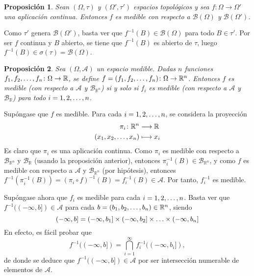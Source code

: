 \documentclass[11pt]{report}
\makeatletter
\renewenvironment{proof}[1][\proofname]{\par
  \pushQED{\qed}%
  \normalfont \topsep\z@skip %
  \trivlist
  \item[\hskip\labelsep
        \itshape
    #1\@addpunct{.}]\ignorespaces
}{%
  \popQED\endtrivlist\@endpefalse
}
\theoremstyle{mytheorem}
\newtheorem{proposition}{Proposición}
\theoremstyle{mydefinition}
\theoremstyle{myexample}
\let\oldproofname=\proofname
\renewcommand{\proofname}{\rm\bf{\oldproofname}}}
\newenvironment{cproposition} %
  {\begin{mdframed}[
        linewidth=3pt,
        linecolor=c2,
        bottomline=false,
        topline=false,
        rightline=false,
        innerrightmargin=0pt,
        innertopmargin=0pt,
        innerbottommargin=0pt,
        innerleftmargin=1em,
        skipabove=\baselineskip]
    \begin{proposition}}
  {\end{proposition}\end{mdframed}}
\newcommand{\R}{\mathbb R}
\makeatother
\begin{document}
\begin{cproposition}
Sean $(\Omega,\tau)$ y $(\Omega',\tau')$ espacios topológicos y sea $f \colon \Omega \to \Omega'$ una aplicación continua. Entonces $f$ es medible con respecto a $\mathcal{B}(\Omega)$ y $\mathcal{B}(\Omega')$.
\end{cproposition}

\begin{proof}
Como $\tau'$ genera $\mathcal{B}(\Omega')$, basta ver que $f^{-1}(B) \in \mathcal{B}(\Omega)$ para todo $B \in \tau'$. Por ser $f$ continua y $B$ abierto, se tiene que $f^{-1}(B)$ es abierto de $\tau$, luego $f^{-1}(B) \in \sigma(\tau) = \mathcal{B}(\Omega)$.
\end{proof}

\begin{cproposition}
\label{prop3.5.}
Sea $(\Omega, \mathcal{A})$ un espacio medible. Dadas $n$ funciones $f_1,f_2,\mathellipsis,f_n \colon \Omega \to \R$, se define $f =(f_1,f_2,\mathellipsis,f_n) \colon \Omega \to \R^n$. Entonces $f$ es medible (con respecto a $\mathcal{A}$ y $\mathcal{B}_{\R^n}$) si y solo si $f_i$ es medible (con respecto a $\mathcal{A}$ y $\mathcal{B}_\R$) para todo $i = 1,2,\mathellipsis,n$.
\end{cproposition}

\begin{proof}
Supóngase que $f$ es medible. Para cada $i =1,2,\mathellipsis,n$, se considera la proyección
\[
\begin{aligned}[t]
    \pi_i \colon \R^n &\longrightarrow \R \\
    (x_1,x_2,\mathellipsis,x_n) &\longmapsto x_i
\end{aligned}
\]
Es claro que $\pi_i$ es una aplicación continua. Como $\pi_i$ es medible con respecto a $\mathcal{B}_{\R^n}$ y $\mathcal{B}_\R$ (usando la proposición anterior), entonces $\pi_i^{-1}(B) \in \mathcal{B}_{\R^n}$, y como $f$ es medible con respecto a $\mathcal{A}$ y $\mathcal{B}_{\R^n}$ (por hipótesis), entonces $f^{-1}(\pi_i^{-1}(B)) = (\pi_i \circ f)^{-1}(B) = f_i^{-1}(B) \in \mathcal{A}$. Por tanto, $f^{-1}_i$ es medible.

\vspace{2mm}

Supóngase ahora que $f_i$ es medible para cada $i=1,2,\mathellipsis,n$. Basta ver que $f^{-1}((-\infty,b]) \in \mathcal{A}$ para cada $b =(b_1,b_2,\mathellipsis,b_n)\in \R^n$, siendo
\[(-\infty,b] = (-\infty,b_1] \times (-\infty,b_2] \times \mathellipsis \times (-\infty,b_n]\]
En efecto, es fácil probar que
\[f^{-1}((-\infty,b]) = \bigcap_{i=1}^\infty f^{-1}_i((-\infty,b_i]),\]
de donde se deduce que $f^{-1}((-\infty,b]) \in \mathcal{A}$ por ser intersección numerable de elementos de $\mathcal{A}$.
\end{proof}
\end{document}
